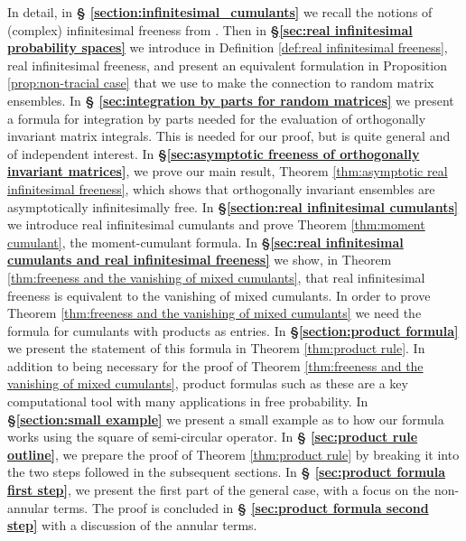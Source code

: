 \documentclass[11pt]{amsart}
\theoremstyle{definition}
\numberwithin{theorem}{section}
\begin{document}
In detail, in \textbf{\S
  \ref{section:infinitesimal_cumulants}} we recall the
notions of (complex) infinitesimal freeness from
\cite{fn}. Then in \textbf{ \S \ref{sec:real infinitesimal
    probability spaces}} we introduce in Definition
\ref{def:real infinitesimal freeness}, real infinitesimal
freeness, and present an equivalent formulation in
Proposition \ref{prop:non-tracial case} that we use to make
the connection to random matrix ensembles. In \textbf{\S
  \ref{sec:integration by parts for random matrices}} we
present a formula for integration by parts needed for the
evaluation of orthogonally invariant matrix integrals. This
is needed for our proof, but is quite general and of
independent interest. In \textbf{\S \ref{sec:asymptotic
    freeness of orthogonally invariant matrices}}, we prove
our main result, Theorem \ref{thm:asymptotic real
  infinitesimal freeness}, which shows that orthogonally
invariant ensembles are asymptotically infinitesimally free.
In \textbf{\S \ref{section:real infinitesimal cumulants}} we
introduce real infinitesimal cumulants and prove Theorem
\ref{thm:moment cumulant}, the moment-cumulant formula. In
\textbf{\S \ref{sec:real infinitesimal cumulants and real
    infinitesimal freeness}} we show, in Theorem
\ref{thm:freeness and the vanishing of mixed cumulants},
that real infinitesimal freeness is equivalent to the
vanishing of mixed cumulants. In order to prove Theorem
\ref{thm:freeness and the vanishing of mixed cumulants} we
need the formula for cumulants with products as entries. In
\textbf{\S \ref{section:product formula}} we present the
statement of this formula in Theorem \ref{thm:product
  rule}. In addition to being necessary for the proof of
Theorem \ref{thm:freeness and the vanishing of mixed
  cumulants}, product formulas such as these are a key
computational tool with many applications in free
probability. In \textbf{\S \ref{section:small example}} we
present a small example as to how our formula works using
the square of semi-circular operator.  In \textbf{\S
  \ref{sec:product rule outline}}, we prepare the proof of
Theorem \ref{thm:product rule} by breaking it into the two
steps followed in the subsequent sections. In \textbf{\S
  \ref{sec:product formula first step}}, we present the
first part of the general case, with a focus on the
non-annular terms. The proof is concluded in \textbf{\S
  \ref{sec:product formula second step}} with a discussion
of the annular terms.
\end{document}
